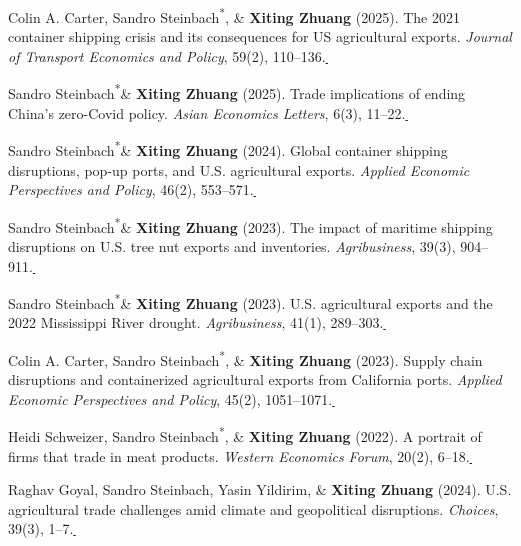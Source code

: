\documentclass[10.8 pt,letterpaper]{article}
\newcommand{\corrauthor}{\textsuperscript{*}}
\newcommand{\paperlink}[1]{\href{#1}{\,\small\faExternalLink}}
\renewenvironment{itemize}{
	\begin{list}{}{
			\setlength{\leftmargin}{1.5em}
		}
	}{
	\end{list}
}
\begin{document}
\begin{itemize}
		\item[-] Colin A. Carter, Sandro Steinbach\corrauthor, \& \textbf{Xiting Zhuang} (2025). The 2021 container shipping crisis and its consequences for US agricultural exports. \textit{Journal of Transport Economics and Policy}, 59(2), 110--136.\paperlink{https://www.ingentaconnect.com/contentone/lse/jtep/2025/00000059/00000002/art00004}
		
		\item[-] Sandro Steinbach\corrauthor \& \textbf{Xiting Zhuang} (2025). Trade implications of ending China's zero-Covid policy. \textit{Asian Economics Letters}, 6(3), 11--22.\paperlink{https://doi.org/10.46557/001c.137226}
		
		\item[-] Sandro Steinbach\corrauthor \& \textbf{Xiting Zhuang} (2024). Global container shipping disruptions, pop-up ports, and U.S. agricultural exports. \textit{Applied Economic Perspectives and Policy}, 46(2), 553--571.\paperlink{https://doi.org/10.1002/aepp.13399}
		
		\item[-] Sandro Steinbach\corrauthor \& \textbf{Xiting Zhuang} (2023). The impact of maritime shipping disruptions on U.S. tree nut exports and inventories. \textit{Agribusiness}, 39(3), 904--911.\paperlink{https://doi.org/10.1002/agr.21809}
		
		\item[-] Sandro Steinbach\corrauthor \& \textbf{Xiting Zhuang} (2023). U.S. agricultural exports and the 2022 Mississippi River drought. \textit{Agribusiness}, 41(1), 289--303.\paperlink{https://doi.org/10.1002/agr.21880}
		
		\item[-] Colin A. Carter, Sandro Steinbach\corrauthor, \& \textbf{Xiting Zhuang} (2023). Supply chain disruptions and containerized agricultural exports from California ports. \textit{Applied Economic Perspectives and Policy}, 45(2), 1051--1071.\paperlink{https://doi.org/10.1002/aepp.13311}
		
		\item[-] Heidi Schweizer, Sandro Steinbach\corrauthor, \& \textbf{Xiting Zhuang} (2022). A portrait of firms that trade in meat products. \textit{Western Economics Forum}, 20(2), 6--18.\paperlink{https://doi.org/10.22004/ag.econ.329728}
		
		\item[-] Raghav Goyal, Sandro Steinbach, Yasin Yildirim, \& \textbf{Xiting Zhuang} (2024). U.S. agricultural trade challenges amid climate and geopolitical disruptions. \textit{Choices}, 39(3), 1--7.\paperlink{https://www.choicesmagazine.org/choices-magazine/submitted-articles/us-agricultural-trade-challenges-amid-climate-and-geopolitical-disruptions}
		

\end{itemize}
\end{document}
